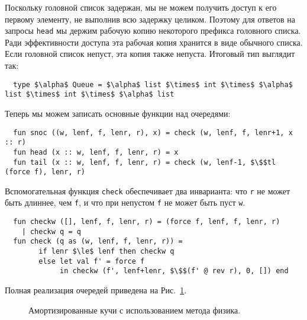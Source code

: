 Поскольку головной список задержан, мы не можем получить доступ к его
первому элементу, не выполнив всю задержку целиком.  Поэтому для
ответов на запросы \lstinline!head! мы держим рабочую копию некоторого
префикса головного списка. Ради эффективности доступа эта рабочая
копия хранится в виде обычного списка. Если головной список непуст,
эта копия также непуста. Итоговый тип выглядит так:
\begin{lstlisting}
  type $\alpha$ Queue = $\alpha$ list $\times$ int $\times$ $\alpha$ list $\times$ int $\times$ $\alpha$ list
\end{lstlisting}
Теперь мы можем записать основные функции над очередями:
\begin{lstlisting}
  fun snoc ((w, lenf, f, lenr, r), x) = check (w, lenf, f, lenr+1, x :: r)
  fun head (x :: w, lenf, f, lenr, r) = x
  fun tail (x :: w, lenf, f, lenr, r) = check (w, lenf-1, $\$$tl (force f), lenr, r)
\end{lstlisting}
Вспомогательная функция \lstinline!check! обеспечивает два инварианта:
что \lstinline!r! не может быть длиннее, чем \lstinline!f!, и что при
непустом \lstinline!f! не может быть пуст \lstinline!w!.
\begin{lstlisting}
  fun checkw ([], lenf, f, lenr, r) = (force f, lenf, f, lenr, r)
    | checkw q = q
  fun check (q as (w, lenf, f, lenr, r)) =
        if lenr $\le$ lenf then checkw q
        else let val f' = force f
             in checkw (f', lenf+lenr, $\$$(f' @ rev r), 0, []) end
\end{lstlisting}
Полная реализация очередей приведена на Рис.~\ref{fig:6.3}.

\begin{figure}
  \centering
  
  \caption{Амортизированные кучи с использованием метода физика.}
  \label{fig:6.3}
\end{figure}

